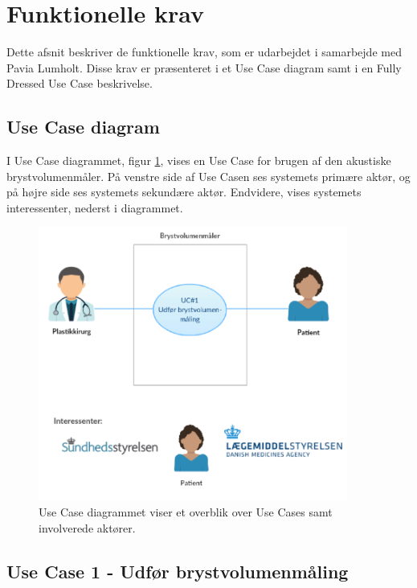 	\section{Funktionelle krav}	
	Dette afsnit beskriver de funktionelle krav, som er udarbejdet i samarbejde med Pavia Lumholt. Disse krav er præsenteret i et Use Case diagram samt i en Fully Dressed Use Case beskrivelse.  
	
	\pagebreak
	
		\subsection{Use Case diagram}
		I Use Case diagrammet, figur \ref{fig:UC1}, vises en Use Case for brugen af den akustiske brystvolumenmåler. På venstre side af Use Casen ses systemets primære aktør, og på højre side ses systemets sekundære aktør. Endvidere, vises systemets interessenter, nederst i diagrammet.  
	
			\begin{figure}[htb]
				\centering
					\includegraphics[width=4in]{UC1.png}
					\caption{Use Case diagrammet viser et overblik over Use Cases samt involverede aktører.}
					\label{fig:UC1}
			\end{figure}	 
	\pagebreak	
	\newpage	
  
  		\subsection{Use Case 1 - Udfør brystvolumenmåling}
  			

